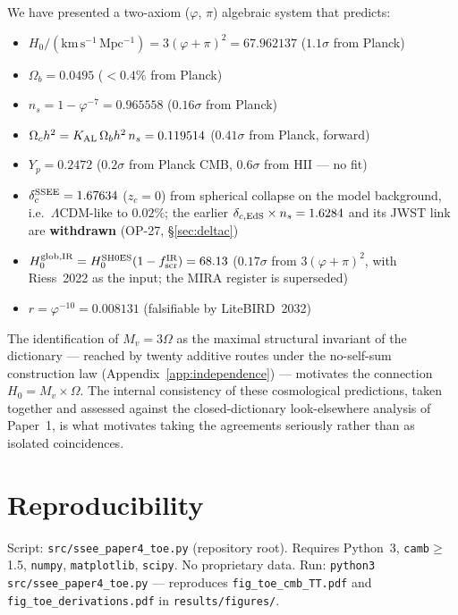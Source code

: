 \documentclass[12pt,a4paper]{article}
\begin{document}
We have presented a two-axiom ($\varphi$, $\pi$) algebraic system that predicts:
\begin{itemize}
  \item $H_0/(\mathrm{km\,s^{-1}\,Mpc^{-1}}) = 3(\varphi+\pi)^2 = 67.962137$ ($1.1\sigma$ from Planck)
  \item $\Omega_b = 0.0495$ ($<0.4\%$ from Planck)
  \item $n_s = 1-\varphi^{-7} = 0.965558$ ($0.16\sigma$ from Planck)
  \item $\Omega_c h^2 = K_{\rm AL}\,\Omega_b h^2\,n_s = 0.119514$ ($0.41\sigma$ from Planck, forward)
  \item $Y_p = 0.2472$ ($0.2\sigma$ from Planck CMB, $0.6\sigma$ from HII — no fit)
  \item $\delta_c^{\rm SSEE} = 1.67634$ ($z_c{=}0$) from spherical collapse on the
        model background, i.e.\ $\Lambda$CDM-like to $0.02\%$; the earlier
        $\delta_{c,\rm EdS}\times n_s = 1.6284$ and its JWST link are
        \textbf{withdrawn} (OP-27, \S\ref{sec:deltac})
  \item $H_0^{\rm glob,IR} = H_0^{\rm SH0ES}(1-f_{\rm scr}^{\rm IR}) = 68.13$ ($0.17\sigma$ from $3(\varphi+\pi)^2$, with Riess~2022 as the input; the MIRA register is superseded)
  \item $r = \varphi^{-10} = 0.008131$ (falsifiable by LiteBIRD~2032)
\end{itemize}

The identification of $M_v=3\Omega$ as the maximal structural
invariant of the dictionary --- reached by twenty additive routes under the
no-self-sum construction law (Appendix~\ref{app:independence}) --- motivates the
connection $H_0 = M_v \times \Omega$.
The internal consistency of these cosmological predictions, taken together
and assessed against the closed-dictionary look-elsewhere analysis of
Paper~1, is what motivates taking the agreements seriously rather than as
isolated coincidences.

\section*{Reproducibility}

Script: \texttt{src/ssee\_paper4\_toe.py} (repository root).
Requires Python~3, \texttt{camb}$\geq$1.5, \texttt{numpy}, \texttt{matplotlib},
\texttt{scipy}.  No proprietary data.
Run: \texttt{python3 src/ssee\_paper4\_toe.py} — reproduces
\texttt{fig\_toe\_cmb\_TT.pdf} and \texttt{fig\_toe\_derivations.pdf}
in \texttt{results/figures/}.
\end{document}
